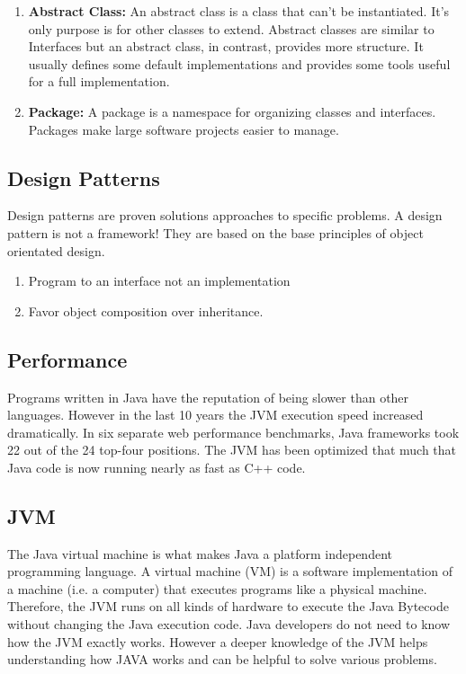 \begin{enumerate}
\item \textbf{Abstract Class:}
An abstract class is a class that can't be instantiated. It's only purpose is for other classes to extend. Abstract classes are similar to Interfaces but an abstract class, in contrast, provides more structure. It usually defines some default implementations and provides some tools useful for a full implementation.\cite{javaAbstractVsInterface}

\item \textbf{Package:} 
A package is a namespace for organizing classes and interfaces. Packages make large software projects easier to manage. \cite{javaOBjectOracle}
\end{enumerate}


\subsection{Design Patterns}
Design patterns are proven solutions approaches to specific problems. A design pattern is not a framework! They are based on the base principles of object orientated design. 

\begin{enumerate}
\item Program to an interface not an implementation
\item Favor object composition over inheritance.
\end{enumerate}

\subsection{Performance}
Programs written in Java have the reputation of being slower than other languages. However in the last 10 years the JVM execution speed increased dramatically. In six separate web performance benchmarks, Java frameworks took 22 out of the 24 top-four positions. The JVM has been optimized that much that Java code is now running nearly as fast as C++ code. \cite{javaPerfromance}

\subsection{JVM}
The Java virtual machine is what makes Java a platform independent programming language. A virtual machine (VM) is a software implementation of a machine (i.e. a computer) that executes programs like a physical machine. Therefore, the JVM runs on all kinds of hardware to execute the Java Bytecode without changing the Java execution code. Java developers do not need to know how the JVM exactly works. However a deeper knowledge of the JVM helps understanding how JAVA works and can be helpful to solve various problems.\cite{javaJVM} 
\\


